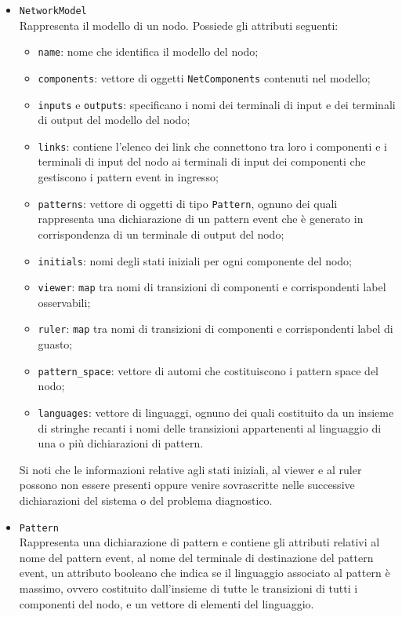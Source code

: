 \begin{itemize}
\item \verb|NetworkModel|\\
Rappresenta il modello di un nodo. Possiede gli attributi seguenti:
\begin{itemize}
\item \verb|name|: nome che identifica il modello del nodo;
\item \verb|components|: vettore di oggetti \verb|NetComponents| contenuti nel modello;
\item \verb|inputs| e \verb|outputs|: specificano i nomi dei terminali di input e dei terminali di output del modello del nodo;
\item \verb|links|: contiene l'elenco dei link che connettono tra loro i componenti e i terminali di input del nodo ai terminali di input dei componenti che gestiscono i pattern event in ingresso;
\item \verb|patterns|: vettore di oggetti di tipo \verb|Pattern|, ognuno dei quali rappresenta una dichiarazione di un pattern event che è generato in corrispondenza di un terminale di output del nodo;
\item \verb|initials|: nomi degli stati iniziali per ogni componente del nodo;
\item \verb|viewer|: \verb|map| tra nomi di transizioni di componenti e corrispondenti label osservabili;
\item \verb|ruler|: \verb|map| tra nomi di transizioni di componenti e corrispondenti label di guasto;
\item \verb|pattern_space|: vettore di automi che costituiscono i pattern space del nodo;
\item \verb|languages|: vettore di linguaggi, ognuno dei quali costituito da un insieme di stringhe recanti i nomi delle transizioni appartenenti al linguaggio di una o più dichiarazioni di pattern.
\end{itemize}
Si noti che le informazioni relative agli stati iniziali, al viewer e al ruler possono non essere presenti oppure venire sovrascritte nelle successive dichiarazioni del sistema o del problema diagnostico.
\item \verb|Pattern|\\
Rappresenta una dichiarazione di pattern e contiene gli attributi relativi al nome del pattern event, al nome del terminale di destinazione del pattern event, un attributo booleano che indica se il linguaggio associato al pattern è massimo, ovvero costituito dall'insieme di tutte le transizioni di tutti i componenti del nodo, e un vettore di elementi del linguaggio.

\end{itemize}
